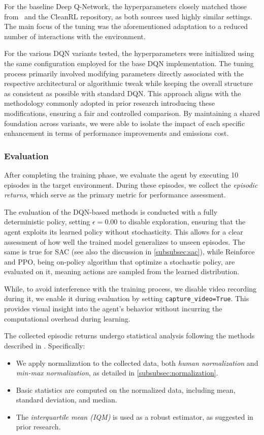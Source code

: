 For the baseline Deep Q-Network, the hyperparameters closely matched those from~\cite{mnih:human} and the CleanRL repository, as both sources used highly similar settings. The main focus of the tuning was the aforementioned adaptation to a reduced number of interactions with the environment.

For the various DQN variants tested, the hyperparameters were initialized using the same configuration employed for the base DQN implementation. The tuning process primarily involved modifying parameters directly associated with the respective architectural or algorithmic tweak while keeping the overall structure as consistent as possible with standard DQN. This approach aligns with the methodology commonly adopted in prior research introducing these modifications, ensuring a fair and controlled comparison. By maintaining a shared foundation across variants, we were able to isolate the impact of each specific enhancement in terms of performance improvements and emissions cost.

\subsubsection{Evaluation}

After completing the training phase, we evaluate the agent by executing \num{10} episodes in the target environment. During these episodes, we collect the \textit{episodic returns}, which serve as the primary metric for performance assessment.

The evaluation of the DQN-based methods is conducted with a fully deterministic policy, setting $\epsilon = 0.00$ to disable exploration, ensuring that the agent exploits its learned policy without stochasticity. This allows for a clear assessment of how well the trained model generalizes to unseen episodes. The same is true for SAC (see also the discussion in \ref{subsubsec:sac}), while Reinforce and PPO, being on-policy algorithm that optimize a stochastic policy, are evaluated on it, meaning actions are sampled from the learned distribution.

While, to avoid interference with the training process, we disable video recording during it, we enable it during evaluation by setting \texttt{capture\_video=True}. This provides visual insight into the agent's behavior without incurring the computational overhead during learning.

The collected episodic returns undergo statistical analysis following the methods described in . Specifically:
\begin{itemize}
	\item We apply normalization to the collected data, both \emph{human normalization} and \emph{min-max normalization}, as detailed in \ref{subsubsec:normalization}.
	\item Basic statistics are computed on the normalized data, including mean, standard deviation, and median.
	\item The \emph{interquartile mean (IQM)} is used as a robust estimator, as suggested in prior research.

\end{itemize}

